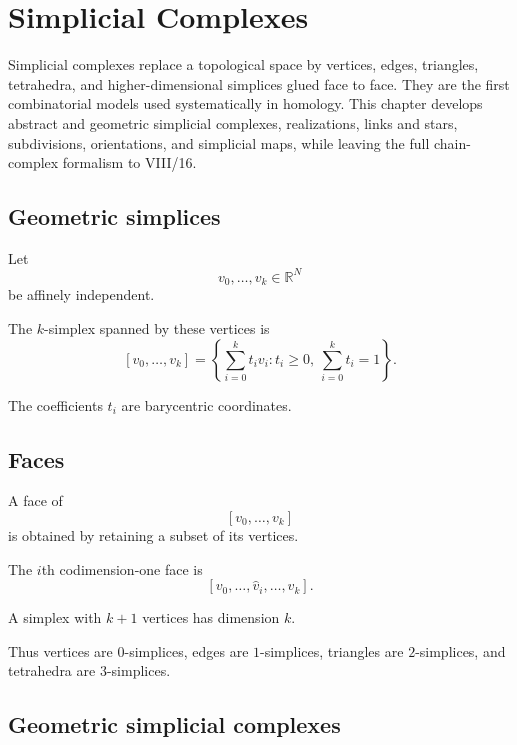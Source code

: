 ﻿\chapter{Simplicial Complexes}
\label{ch:viii15-simplicial-complexes}

Simplicial complexes replace a topological space by vertices, edges, triangles,
tetrahedra, and higher-dimensional simplices glued face to face.  They are the
first combinatorial models used systematically in homology.  This chapter
develops abstract and geometric simplicial complexes, realizations, links and
stars, subdivisions, orientations, and simplicial maps, while leaving the full
chain-complex formalism to VIII/16.

\section{Geometric simplices}

Let
\[
v_0,\dots,v_k\in\mathbb R^N
\]
be affinely independent.

\begin{definition}
\label{def:viii15-geometric-simplex}
The \(k\)-simplex spanned by these vertices is
\[
[v_0,\dots,v_k]
=
\left\{
\sum_{i=0}^k t_iv_i:
t_i\ge0,\ \sum_{i=0}^k t_i=1
\right\}.
\]
\end{definition}

The coefficients \(t_i\) are barycentric coordinates.

\section{Faces}

A face of
\[
[v_0,\dots,v_k]
\]
is obtained by retaining a subset of its vertices.

The \(i\)th codimension-one face is
\[
[v_0,\dots,\widehat v_i,\dots,v_k].
\]

\begin{definition}[Dimension]
\label{def:viii15-simplex-dim}
A simplex with \(k+1\) vertices has dimension \(k\).
\end{definition}

Thus vertices are \(0\)-simplices, edges are \(1\)-simplices, triangles are
\(2\)-simplices, and tetrahedra are \(3\)-simplices.

\section{Geometric simplicial complexes}

